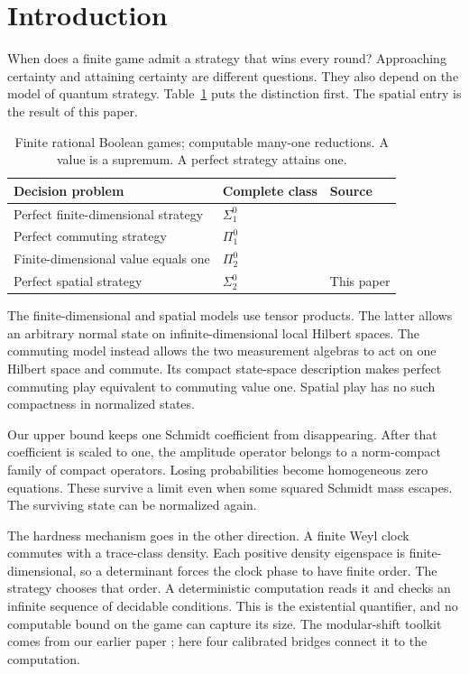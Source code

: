 \section{Introduction}\label{sec:intro}
When does a finite game admit a strategy that wins every round? Approaching certainty and attaining certainty are different questions. They also depend on the model of quantum strategy. Table~\ref{tab:landscape} puts the distinction first. The spatial entry is the result of this paper.

\begin{table}[ht]
\centering\small
\begin{tabular}{@{}p{.53\linewidth}ll@{}}
\toprule
Decision problem & Complete class & Source\\
\midrule
Perfect finite-dimensional strategy & $\Sigma^0_1$ & \cite{MIPRE}\\
Perfect commuting strategy & $\Pi^0_1$ & \cite{Slofstra,MNY}\\
Finite-dimensional value equals one & $\Pi^0_2$ & \cite{MNY}\\
Perfect spatial strategy & $\Sigma^0_2$ & This paper\\
\bottomrule
\end{tabular}
\caption{Finite rational Boolean games; computable many-one reductions. A value is a supremum. A perfect strategy attains one.}\label{tab:landscape}
\end{table}

The finite-dimensional and spatial models use tensor products. The latter allows an arbitrary normal state on infinite-dimensional local Hilbert spaces. The commuting model instead allows the two measurement algebras to act on one Hilbert space and commute. Its compact state-space description makes perfect commuting play equivalent to commuting value one. Spatial play has no such compactness in normalized states.

Our upper bound keeps one Schmidt coefficient from disappearing. After that coefficient is scaled to one, the amplitude operator belongs to a norm-compact family of compact operators. Losing probabilities become homogeneous zero equations. These survive a limit even when some squared Schmidt mass escapes. The surviving state can be normalized again.

The hardness mechanism goes in the other direction. A finite Weyl clock commutes with a trace-class density. Each positive density eigenspace is finite-dimensional, so a determinant forces the clock phase to have finite order. The strategy chooses that order. A deterministic computation reads it and checks an infinite sequence of decidable conditions. This is the existential quantifier, and no computable bound on the game can capture its size. The modular-shift toolkit comes from our earlier paper \cite{Entropy}; here four calibrated bridges connect it to the computation.

